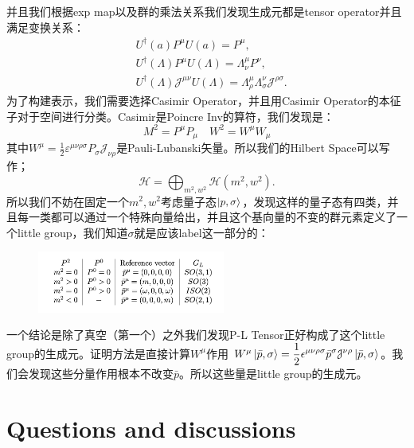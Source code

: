并且我们根据exp map以及群的乘法关系我们发现生成元都是tensor operator并且满足变换关系：
\begin{equation}
  \begin{aligned}&U^\dagger(a)P^\mu U(a)=P^\mu,\\&U^\dagger(\Lambda)P^\mu U(\Lambda)=\Lambda_\nu^\mu P^\nu,\\&U^\dagger(\Lambda)\mathcal{J}^{\mu\nu}U(\Lambda)=\Lambda_\rho^\mu\Lambda_\sigma^\nu\mathcal{J}^{\rho\sigma}.\end{aligned}
  \label{eq:transform}
\end{equation}
为了构建表示，我们需要选择Casimir Operator，并且用Casimir Operator的本征子对于空间进行分类。Casimir是Poincre Inv的算符，我们发现是：
\begin{equation}
  M^2=P^\mu P_\mu \quad W^2=W^\mu W_\mu 
  \label{eq:casimirpoincare}
\end{equation}
其中$ W^\mu = \displaystyle\frac{1}{2}\varepsilon^{\mu\nu\rho\sigma}P_\sigma \mathcal{J}_{\nu\rho} $是Pauli-Lubanski矢量。所以我们的Hilbert Space可以写作；
\begin{equation}
  \mathcal{H}=\bigoplus_{m^2,w^2}\mathcal{H}(m^2,w^2).  
  \label{eq:Hilbertspace}
\end{equation}
所以我们不妨在固定一个$ m^2, w^2 $考虑量子态$ \ket{p,\sigma} $，发现这样的量子态有四类，并且每一类都可以通过一个特殊向量给出，并且这个基向量的不变的群元素定义了一个little group，我们知道$ \sigma $就是应该label这一部分的：

\begin{figure}[H]
  \centering
  \includegraphics[width=0.55\textwidth]{assets/littlegroup.png}
  \label{fig:littlegroup}
\end{figure}
一个结论是除了真空（第一个）之外我们发现P-L Tensor正好构成了这个little group的生成元。证明方法是直接计算$ W^\mu $作用 $ W^\mu \ket{\bar{p},\sigma} = \displaystyle\frac{1}{2} \epsilon^{\mu\nu\rho\sigma} \bar{p}^\sigma \mathcal{J}^{\nu\rho} \ket{\bar{p}, \sigma}$。我们会发现这些分量作用根本不改变$ \bar{p} $。所以这些量是little group的生成元。






\section{Questions and discussions}\label{sec:Questions and discussions} %

